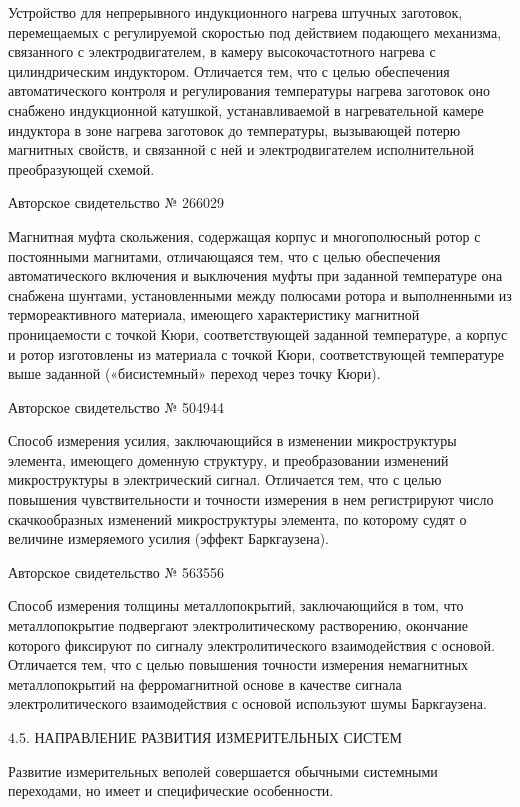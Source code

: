 Устройство для  непрерывного индукционного нагрева  штучных заготовок,
перемещаемых   с  регулируемой   скоростью  под   действием  подающего
механизма, связанного  с электродвигателем, в  камеру высокочастотного
нагрева  с  цилиндрическим индуктором.  Отличается  тем,  что с  целью
обеспечения  автоматического  контроля   и  регулирования  температуры
нагрева заготовок оно  снабжено индукционной катушкой, устанавливаемой
в  нагревательной  камере  индуктора   в  зоне  нагрева  заготовок  до
температуры, вызывающей потерю магнитных свойств,  и связанной с ней и
электродвигателем исполнительной преобразующей схемой.


Авторское свидетельство № 266029

Магнитная муфта скольжения, содержащая  корпус и многополюсный ротор с
постоянными  магнитами,  отличающаяся  тем, что  с  целью  обеспечения
автоматического включения и выключения  муфты при заданной температуре
она  снабжена   шунтами,  установленными   между  полюсами   ротора  и
выполненными  из термореактивного  материала, имеющего  характеристику
магнитной  проницаемости  с   точкой  Кюри,  соответствующей  заданной
температуре, а корпус и ротор  изготовлены из материала с точкой Кюри,
соответствующей температуре выше заданной («бисистемный» переход через
точку Кюри).


Авторское свидетельство № 504944

Способ  измерения  усилия,  заключающийся в  изменении  микроструктуры
элемента,  имеющего  доменную  структуру, и  преобразовании  изменений
микроструктуры  в электрический  сигнал. Отличается  тем, что  с целью
повышения  чувствительности и  точности измерения  в нем  регистрируют
число  скачкообразных изменений  микроструктуры элемента,  по которому
судят о величине измеряемого усилия (эффект Баркгаузена).


Авторское свидетельство № 563556

Способ  измерения толщины  металлопокрытий, заключающийся  в том,  что
металлопокрытие  подвергают электролитическому  растворению, окончание
которого  фиксируют  по  сигналу электролитического  взаимодействия  с
основой.  Отличается тем,  что  с целью  повышения точности  измерения
немагнитных  металлопокрытий  на   ферромагнитной  основе  в  качестве
сигнала  электролитического взаимодействия  с основой  используют шумы
Баркгаузена.


4.5. НАПРАВЛЕНИЕ РАЗВИТИЯ ИЗМЕРИТЕЛЬНЫХ СИСТЕМ

Развитие   измерительных  веполей   совершается  обычными   системными
переходами, но имеет и специфические особенности.


